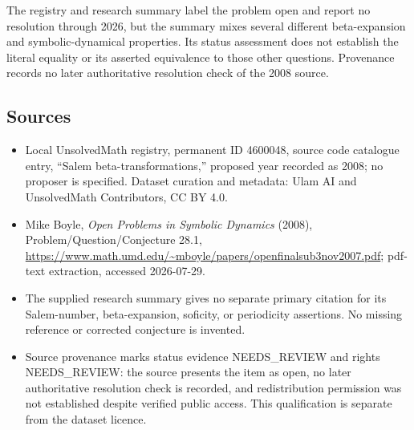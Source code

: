 \documentclass[11pt]{article}
\begin{document}
The registry and research summary label the problem open and report no resolution through 2026, but the summary mixes several different beta-expansion and symbolic-dynamical properties. Its status assessment does not establish the literal equality or its asserted equivalence to those other questions. Provenance records no later authoritative resolution check of the 2008 source.
\subsection{Sources}
\begin{itemize}
\item Local UnsolvedMath registry, permanent ID 4600048, source code catalogue entry, ``Salem beta-transformations,'' proposed year recorded as 2008; no proposer is specified. Dataset curation and metadata: Ulam AI and UnsolvedMath Contributors, CC BY 4.0.
\item Mike Boyle, \emph{Open Problems in Symbolic Dynamics} (2008), Problem/Question/Conjecture 28.1, \url{https://www.math.umd.edu/~mboyle/papers/openfinalsub3nov2007.pdf}; pdf-text extraction, accessed 2026-07-29.
\item The supplied research summary gives no separate primary citation for its Salem-number, beta-expansion, soficity, or periodicity assertions. No missing reference or corrected conjecture is invented.
\item Source provenance marks status evidence NEEDS\_REVIEW and rights NEEDS\_REVIEW: the source presents the item as open, no later authoritative resolution check is recorded, and redistribution permission was not established despite verified public access. This qualification is separate from the dataset licence.
\end{itemize}
\end{document}

